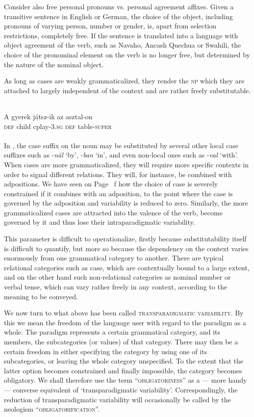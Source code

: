 Consider also free personal pronouns vs. personal agreement affixes. Given a transitive sentence in English or German, the choice of the object, including pronouns of varying person, number or gender, is, apart from selection restrictions, completely free. If the sentence is translated into a language with object agreement of the verb, such as Navaho, Ancash Quechua or Swahili, the choice of the pronominal element on the verb is no longer free, but determined by the nature of the nominal object.

As long as cases are weakly grammaticalized, they render the \textsc{np} which they are attached to largely independent of the context and are rather freely substitutable.

\ea\label{ex:E104}
\langinfo{\LangHung}{}{} \\
\gll     A  gyerek  játsz-ik  az  asztal-on\\
\textsc{def}  child  cplay-3.\textsc{sg}  \textsc{def}  table-\textsc{super}\\
\\
\z
\noindent In , the case suffix on the noun may be substituted by several other local case suffixes such as -\textit{nál} ‘by’, -\textit{ban} ‘in’, and even non-local ones such as -\textit{val} ‘with’. When cases are more grammaticalized, they will require more specific contexts in order to signal different relations. They will, for instance, be combined with adpositions. We have seen on Page~\pageref{page100c}\chk%
f how the choice of case is severely constrained if it combines with an adposition, to the point where the case is governed by the adposition and variability is reduced to zero. Similarly, the more grammaticalized cases are attracted into the valence of the verb, become governed by it and thus lose their intraparadigmatic variability.

This parameter is difficult to operationalize, firstly because substitutability itself is difficult to quantify, but more so because the dependency on the context varies enormously from one grammatical category to another. There are typical relational categories such as case, which are contextually bound to a large extent, and on the other hand such non-relational categories as nominal number or verbal tense, which can vary rather freely in any context, according to the meaning to be conveyed.

We now turn to what above has been called \textsc{transparadigmatic variability}. By this we mean the freedom of the language user with regard to the paradigm as a whole. The paradigm represents a certain grammatical category, and its members, the subcategories (or values) of that category. There may then be a certain freedom in either specifying the category by using one of its subcategories, or leaving the whole category unspecified. To the extent that the latter option becomes constrained and finally impossible, the category becomes obligatory. We shall therefore use the term ``\textsc{obligatoriness}'' as a — more handy — converse equivalent of ‘transparadigmatic variability’. Correspondingly, the reduction of transparadigmatic variability will occasionally be called by the neologism ``\textsc{obligatorification}''.

